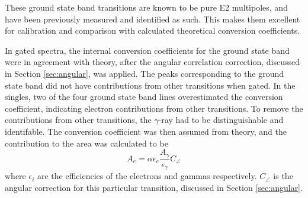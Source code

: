 \afterpage{\clearpage}

These ground state band transitions are known to be pure E2 multipoles, and have been previously measured and identified as such. This makes them excellent for calibration and comparison with calculated theoretical conversion coefficients.

In gated spectra, the internal conversion coefficients for the ground state band were in agreement with theory, after the angular correlation correction, discussed in Section \ref{sec:angular}, was applied. The peaks corresponding to the ground state band did not have contributions from other transitions when gated. In the singles, two of the four ground state band lines overestimated the conversion coefficient, indicating electron contributions from other transitions.  To remove the contributions from other transitions, the $\gamma$-ray had to be distinguishable and identifable. The conversion coefficient was then assumed from theory, and the contribution to the area was calculated to be
\begin{equation}
    \label{eq:ICC_Subtract}
    A_{e} = \alpha \epsilon_{e} \frac{A_{\gamma}}{\epsilon_{\gamma}} C_{\angle}
\end{equation}
where $\epsilon_{i}$ are the efficiencies of the electrons and gammas respectively. $C_{\angle}$ is the angular correction for this particular transition, discussed in Section \ref{sec:angular}.

